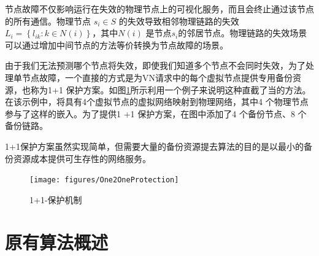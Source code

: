 节点故障不仅影响运行在失效的物理节点上的可视化服务，而且会终止通过该节点的所有通信。物理节点 $ {s_i} \in S $ 的失效导致相邻物理链路的失效${L_i} = \left\{ {{l_{ik}}:k \in N(i)} \right\}$，其中${N(i)}$ 是节点$ {s_i} $的邻居节点。物理链路的失效场景可以通过增加中间节点的方法等价转换为节点故障的场景。

由于我们无法预测哪个节点将失效，即使我们知道多个节点不会同时失效，为了处理单节点故障，一个直接的方式是为VN请求中的每个虚拟节点提供专用备份资源，也称为1+1 保护方案。如图\ref{fig:One2OneProtection}所示利用一个例子来说明这种直截了当的方法。在该示例中，将具有4个虚拟节点的虚拟网络映射到物理网络，其中4 个物理节点参与了这样的嵌入。为了提供1 +1 保护方案，在图中添加了4 个备份节点、8 个备份链路。

1+1保护方案虽然实现简单，但需要大量的备份资源提去算法的目的是以最小的备份资源成本提供可生存性的网络服务。

\begin{figure}[htbp]
\centering
\texttt{[image: figures/One2OneProtection]}\\
\caption{1+1-保护机制}\label{fig:One2OneProtection}
\end{figure}

\section{原有算法概述}
